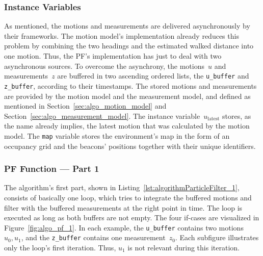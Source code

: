 \subsubsection*{Instance Variables}
As mentioned, the motions and measurements are delivered asynchronously by their frameworks. The motion model's implementation already reduces this problem by combining the two headings and the estimated walked distance into one motion. Thus, the \acs{PF}'s implementation has just to deal with two asynchronous sources. To overcome the asynchrony, the motions~$u$ and measurements~$z$ are buffered in two ascending ordered lists, the \texttt{u\_buffer} and \texttt{z\_buffer}, according to their timestamps. The stored motions and measurements are provided by the motion model and the measurement model, and defined as mentioned in Section~\ref{sec:algo_motion_model} and Section~\ref{sec:algo_measurement_model}. The instance variable~$u_\text{latest}$ stores, as the name already implies, the latest motion that was calculated by the motion model. The \texttt{map} variable stores the environment's map in the form of an occupancy grid and the beacons' positions together with their unique identifiers.


\subsubsection*{\acl{PF} Function --- Part 1}
The algorithm's first part, shown in Listing~\ref{lst:algorithmParticleFilter_1}, consists of basically one loop, which tries to integrate the buffered motions and filter with the buffered measurements at the right point in time. The loop is executed as long as both buffers are not empty. The four if-cases are visualized in Figure~\ref{fig:algo_pf_1}. In each example, the \texttt{u\_buffer} contains two motions~$u_0, u_1$, and the \texttt{z\_buffer} contains one measurement~$z_0$. Each subfigure illustrates only the loop's first iteration. Thus, $u_1$ is not relevant during this iteration.


